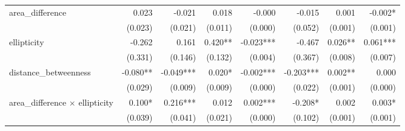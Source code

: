 \begin{tabular}{lrrrrrrr}
area\_difference                           &                        0.023 &                     -0.021 &                        0.018 &                           -0.000 &                         -0.015 &                                                             0.001 &                                             -0.002* \\ 
                                           &                      (0.023) &                    (0.021) &                      (0.011) &                          (0.000) &                        (0.052) &                                                           (0.001) &                                             (0.001) \\ 
ellipticity                                &                       -0.262 &                      0.161 &                      0.420** &                        -0.023*** &                         -0.467 &                                                           0.026** &                                            0.061*** \\ 
                                           &                      (0.331) &                    (0.146) &                      (0.132) &                          (0.004) &                        (0.367) &                                                           (0.008) &                                             (0.007) \\ 
distance\_betweenness                      &                     -0.080** &                  -0.049*** &                       0.020* &                        -0.002*** &                      -0.203*** &                                                           0.002** &                                               0.000 \\ 
                                           &                      (0.029) &                    (0.009) &                      (0.009) &                          (0.000) &                        (0.022) &                                                           (0.001) &                                             (0.000) \\ 
area\_difference $\times$ ellipticity      &                       0.100* &                   0.216*** &                        0.012 &                         0.002*** &                        -0.208* &                                                             0.002 &                                              0.003* \\ 
                                           &                      (0.039) &                    (0.041) &                      (0.021) &                          (0.000) &                        (0.102) &                                                           (0.001) &                                             (0.001) \\ 

\end{tabular}
